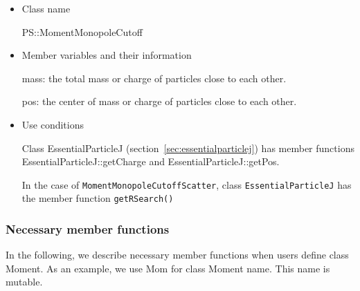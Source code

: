 \begin{itemize}
\item Class name

  PS::MomentMonopoleCutoff

\item Member variables and their information

  mass: the total mass or charge of particles close to each other.

  pos: the center of mass or charge of particles close to each other.

\item Use conditions

  Class EssentialParticleJ (section~\ref{sec:essentialparticlej}) has
  member functions EssentialParticleJ::getCharge and
  EssentialParticleJ::getPos.

  In the case of \texttt{MomentMonopoleCutoffScatter},
  class \texttt{EssentialParticleJ} has the member function
  \texttt{getRSearch()}
  
\end{itemize}

\subsubsection{Necessary member functions}


In the following, we describe necessary member functions when users
define class Moment. As an example, we use Mom for class Moment
name. This name is mutable.


